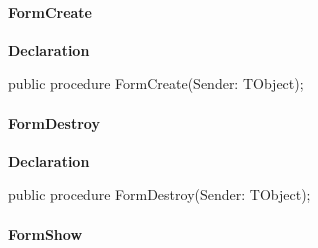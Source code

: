 \documentclass{report}
\newif\ifpdf
\begin{document}
\paragraph*{FormCreate}\hspace*{\fill}

\label{igobase.TIWizFrm-FormCreate}
\begin{list}{}{
\setlength{\itemindent}{0cm}
\setlength{\listparindent}{0cm}
\setlength{\leftmargin}{\evensidemargin}
\addtolength{\leftmargin}{\tmplength}
\settowidth{\labelsep}{X}
\addtolength{\leftmargin}{\labelsep}
\setlength{\labelwidth}{\tmplength}
}
\item[\textbf{Declaration}\hfill]
\ifpdf
\begin{flushleft}
\fi
\begin{ttfamily}
public procedure FormCreate(Sender: TObject);\end{ttfamily}

\ifpdf
\end{flushleft}
\fi

\end{list}
\paragraph*{FormDestroy}\hspace*{\fill}

\label{igobase.TIWizFrm-FormDestroy}
\begin{list}{}{
\setlength{\itemindent}{0cm}
\setlength{\listparindent}{0cm}
\setlength{\leftmargin}{\evensidemargin}
\addtolength{\leftmargin}{\tmplength}
\settowidth{\labelsep}{X}
\addtolength{\leftmargin}{\labelsep}
\setlength{\labelwidth}{\tmplength}
}
\item[\textbf{Declaration}\hfill]
\ifpdf
\begin{flushleft}
\fi
\begin{ttfamily}
public procedure FormDestroy(Sender: TObject);\end{ttfamily}

\ifpdf
\end{flushleft}
\fi

\end{list}
\paragraph*{FormShow}\hspace*{\fill}
\end{document}
